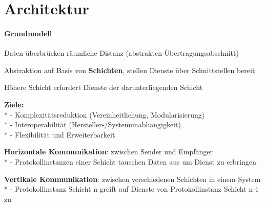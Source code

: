 \section{Architektur}
\paragraph{Grundmodell}
\begin{items}
	\item Daten überbrücken räumliche Distanz (abstrakten Übertragungsabschnitt)
	\item Abstraktion auf Basis von \textbf{Schichten}, stellen Dienste über Schnittstellen bereit
	\item Höhere Schicht erfordert Dienste der darunterliegenden Schicht
	\smallskip
	\item \textbf{Ziele:}\\*
		- Komplexitätsreduktion (Vereinheitlichung, Modularisierung)\\*
		- Interoperabilität (Hersteller-/Systemunabhängigkeit)\\*
		- Flexibilität und Erweiterbarkeit
		\medskip
	\item \textbf{Horizontale Kommunikation}: zwischen Sender und Empfänger \\*
			- Protokollinstanzen einer Schicht tauschen Daten aus um Dienst zu erbringen
	\item \textbf{Vertikale Kommunikation}: zwischen verschiedenen Schichten in einem System \\*
			- Protokollinstanz Schicht n greift auf Dienste von Protokollinstanz Schicht n-1 zu
\end{items}

